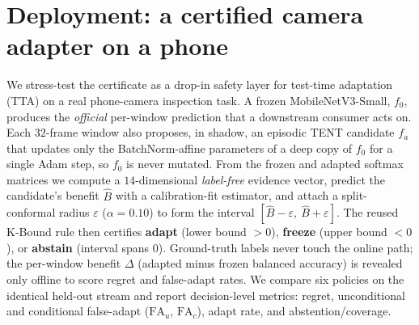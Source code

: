 %
%

\providecommand{\PH}{\textemdash}        %
\providecommand{\Bhat}{\hat{B}}           %

\section{Deployment: a certified camera adapter on a phone}
\label{sec:edge-deploy}

We stress-test the certificate as a drop-in safety layer for test-time
adaptation (TTA) on a real phone-camera inspection task. A frozen
MobileNetV3-Small, $f_0$, produces the \emph{official} per-window prediction that
a downstream consumer acts on. Each $32$-frame window also proposes, in shadow,
an episodic TENT candidate $f_a$ that updates only the BatchNorm-affine
parameters of a deep copy of $f_0$ for a single Adam step, so $f_0$ is never
mutated. From the frozen and adapted softmax matrices we compute a
$14$-dimensional \emph{label-free} evidence vector, predict the candidate's
benefit $\Bhat$ with a calibration-fit estimator, and attach a split-conformal
radius $\varepsilon$ ($\alpha=0.10$) to form the interval
$[\Bhat-\varepsilon,\ \Bhat+\varepsilon]$. The reused K-Bound rule then certifies
\textbf{adapt} (lower bound $>0$), \textbf{freeze} (upper bound $<0$), or
\textbf{abstain} (interval spans $0$). Ground-truth labels never touch the online
path; the per-window benefit $\Delta$ (adapted minus frozen balanced accuracy) is
revealed only offline to score regret and false-adapt rates. We compare six
policies on the identical held-out stream and report decision-level metrics:
regret, unconditional and conditional false-adapt ($\mathrm{FA}_u$,
$\mathrm{FA}_c$), adapt rate, and abstention/coverage.

